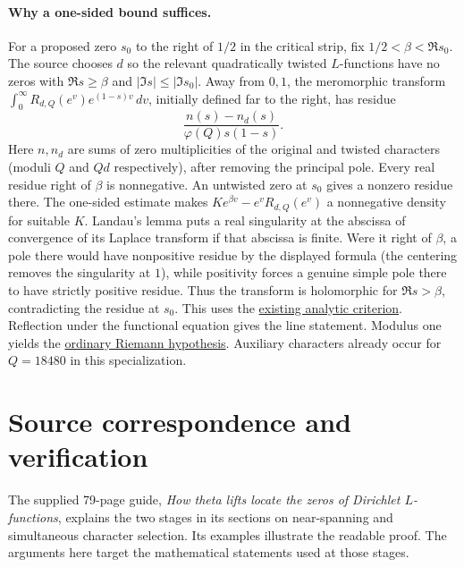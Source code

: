 \documentclass[11pt]{article}
\newcommand{\src}[3]{\href{https://github.com/lsernau/grh-lean/blob/72fead102f663d5c7a407964a13dc0cf9d977207/grh/src/#1.lean\#L#2}{#3}}
\begin{document}
\paragraph{Why a one-sided bound suffices.} For a proposed zero $s_0$ to the right of $1/2$ in the critical strip, fix $1/2<\beta<\Re s_0$. The source chooses $d$ so the relevant quadratically twisted $L$-functions have no zeros with $\Re s\ge\beta$ and $|\Im s|\le|\Im s_0|$. Away from $0,1$, the meromorphic transform $\int_0^\infty R_{d,Q}(e^v)e^{(1-s)v}\,dv$, initially defined far to the right, has residue
\[
  \frac{n(s)-n_d(s)}{\varphi(Q)s(1-s)}.
\]
Here $n,n_d$ are sums of zero multiplicities of the original and twisted characters (moduli $Q$ and $Qd$ respectively), after removing the principal pole. Every real residue right of $\beta$ is nonnegative. An untwisted zero at $s_0$ gives a nonzero residue there. The one-sided estimate makes $K e^{\beta v}-e^v R_{d,Q}(e^v)$ a nonnegative density for suitable $K$. Landau's lemma puts a real singularity at the abscissa of convergence of its Laplace transform if that abscissa is finite. Were it right of $\beta$, a pole there would have nonpositive residue by the displayed formula (the centering removes the singularity at $1$), while positivity forces a genuine simple pole there to have strictly positive residue. Thus the transform is holomorphic for $\Re s>\beta$, contradicting the residue at $s_0$. This uses the \src{New/Reduction/Zeros/Criterion}{37}{existing analytic criterion}. Reflection under the functional equation gives the line statement. Modulus one yields the \src{Main}{5}{ordinary Riemann hypothesis}. Auxiliary characters already occur for $Q=18480$ in this specialization.
\clearpage
\section*{Source correspondence and verification}
The supplied 79-page guide, \emph{How theta lifts locate the zeros of Dirichlet $L$-functions}, explains the two stages in its sections on near-spanning and simultaneous character selection. Its examples illustrate the readable proof. The arguments here target the mathematical statements used at those stages.
\end{document}
